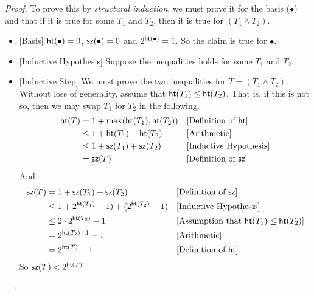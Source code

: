 {\begin{lemma}
\begin{proof}
To prove this by \emph{structural induction}, we must prove it for the basis ($\bullet$)
and that if it is true for some $T_1$ and $T_2$, then it is true for $(T_1\wedge T_2)$.
\begin{itemize}
\item{}[Basis] $\mathord{\textsf{ht}}(\bullet) = 0$, $\mathord{\textsf{sz}}(\bullet) = 0$ 
and $2^{\mathord{\textsf{ht}}(\bullet)} = 1$. So the claim is true for $\bullet$.
\item{}[Inductive Hypothesis] Suppose the inequalities holds for some $T_1$ and $T_2$.
\item{}[Inductive Step] We must prove the two inequalities for $T= (T_1\wedge T_2)$.
Without loss of generality, assume that $\mathord{\textsf{ht}}(T_1)\leq \mathord{\textsf{ht}}(T_2)$. That is, if 
this is not so, then we may swap $T_1$ for $T_2$ in the following. 
\begin{align*}
\mathord{\textsf{ht}}(T) &= 1 + \max(\mathord{\textsf{ht}}(T_1),\mathord{\textsf{ht}}(T_2)) &&\text{[Definition of $\mathord{\textsf{ht}}$]}\\
         &\leq 1 + \mathord{\textsf{ht}}(T_1) + \mathord{\textsf{ht}}(T_2)  &&\text{[Arithmetic]}\\
         &\leq  1 + \mathord{\textsf{sz}}(T_1) + \mathord{\textsf{sz}}(T_2) &&\text{[Inductive Hypothesis]}\\
         &= \mathord{\textsf{sz}}(T) &&\text{[Definition of $\mathord{\textsf{sz}}$]}
       \end{align*}
And
\begin{align*}
\mathord{\textsf{sz}}(T) &= 1 +\mathord{\textsf{sz}}(T_1) + \mathord{\textsf{sz}}(T_2)&&\text{[Definition of $\mathord{\textsf{sz}}$]}\\
       &\leq 1 + 2^{\mathord{\textsf{ht}}(T_1)} - 1) + (2^{\mathord{\textsf{ht}}(T_2)} - 1)&&\text{[Inductive Hypothesis]}\\
       &\leq 2\cdot 2^{\mathord{\textsf{ht}}(T_2)} - 1&&\text{[Assumption that $\mathord{\textsf{ht}}(T_1)\leq \mathord{\textsf{ht}}(T_2)$]}\\
       &= 2^{\mathord{\textsf{ht}}(T_2)+1} - 1 &&\text{[Arithmetic]}\\
       &= 2^{\mathord{\textsf{ht}}(T)} - 1 &&\text{[Definition of $\mathord{\textsf{ht}}$]}
     \end{align*}
So $\mathord{\textsf{sz}}(T) < 2^{\mathord{\textsf{ht}}(T)}$
   \end{itemize}
 \end{proof}  
\end{lemma}

\ipadbreak

}
